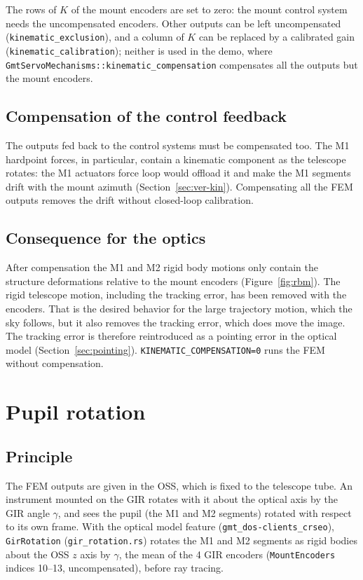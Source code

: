 \documentclass{gmto}
\numberwithin{table}{section}
\numberwithin{equation}{section}
\newcommand{\code}[1]{\texttt{#1}}
\begin{document}
The rows of $K$ of the mount encoders are set to zero: the mount control system needs the
uncompensated encoders. Other outputs can be left uncompensated
(\code{kinematic\_exclusion}), and a column of $K$ can be replaced by a calibrated gain
(\code{kinematic\_calibration}); neither is used in the demo, where
\code{GmtServoMechanisms::kinematic\_compensation} compensates all the outputs but the mount encoders.

\subsection{Compensation of the control feedback}
\label{sec:kin-feedback}

The outputs fed back to the control systems must be compensated too. The M1 hardpoint forces, in
particular, contain a kinematic component as the telescope rotates: the M1 actuators force loop would
offload it and make the M1 segments drift with the mount azimuth (Section~\ref{sec:ver-kin}).
Compensating all the FEM outputs removes the drift without closed-loop calibration.

\subsection{Consequence for the optics}
\label{sec:kin-optics}

After compensation the M1 and M2 rigid body motions only contain the structure deformations
relative to the mount encoders (Figure~\ref{fig:rbm}). The rigid telescope motion, including the
tracking error, has been removed with the encoders. That is the desired behavior for the large
trajectory motion, which the sky follows, but it also removes the tracking error, which
does move the image. The tracking error is therefore reintroduced as a pointing error in the optical
model (Section~\ref{sec:pointing}). \code{KINEMATIC\_COMPENSATION=0} runs the FEM without compensation.

\section{Pupil rotation}
\label{sec:pupil}

\subsection{Principle}
\label{sec:pupil-principle}

The FEM outputs are given in the OSS, which is fixed to the telescope tube. An instrument mounted on
the GIR rotates with it about the optical axis by the GIR angle $\gamma$, and sees the pupil (the M1
and M2 segments) rotated with respect to its own frame. With the optical model feature
(\code{gmt\_dos-clients\_crseo}), \code{GirRotation} (\code{gir\_rotation.rs}) rotates the M1 and
M2 segments as rigid bodies about the OSS $z$ axis by $\gamma$, the mean of the 4 GIR encoders
(\code{MountEncoders} indices 10--13, uncompensated), before ray tracing.
\end{document}
